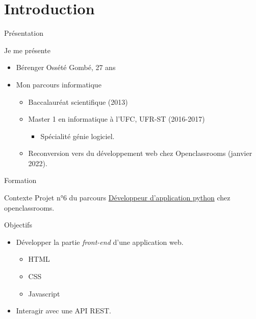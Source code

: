 \section{Introduction}

\begin{frame}{Présentation}
  \begin{block}{Je me présente}
    \begin{itemize}
    \item Bérenger Ossété Gombé, 27 ans
    \item Mon parcours informatique
      \begin{itemize}
      \item Baccalauréat scientifique (2013)
      \item Master 1 en informatique à l'UFC, UFR-ST (2016-2017)
        \begin{itemize}
        \item Spécialité génie logiciel.
        \end{itemize}
      \item Reconversion vers du développement web chez Openclassrooms
        (janvier 2022).
      \end{itemize}      
    \end{itemize}
  \end{block}
\end{frame}

\begin{frame}{Formation}

  \begin{block}{Contexte}
    Projet n°6 du parcours \underline{Développeur d'application python} chez openclassrooms.
  \end{block}
  
  \begin{block}{Objectifs}
    \begin{itemize}
    \item Développer la partie \textit{front-end} d’une application web.
      \begin{itemize}
      \item HTML
      \item CSS       
      \item Javascript
      \end{itemize}
    \item Interagir avec une API REST.
    \end{itemize}
  \end{block}
\end{frame}

